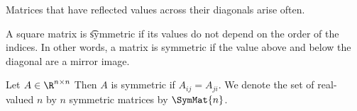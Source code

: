 

Matrices that have reflected values
across their diagonals arise often.


A square matrix is \t{symmetric} if its values do not depend on the order of the indices.
In other words, a matrix is symmetric if the value above and below the diagonal are a mirror image.



Let $A \in \R^{n \times n}$
Then $A$ is symmetric if $A_{ij} = A_{ji}$.
We denote the set of real-valued $n$ by $n$
symmetric matrices by $\SymMat{n}$.
